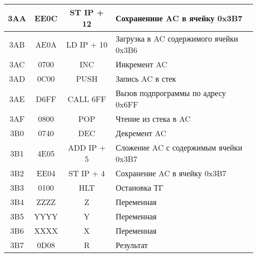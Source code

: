 \begin{flushleft}
\begin{tabular}{|c|c|c|l|}
			3AA & EE0C & ST IP + 12 & Сохраненине AC в ячейку 0x3B7 \\
			\hline
			3AB & AE0A & LD IP + 10 & Загрузка в AC содержимого ячейки 0x3B6 \\

			3AC & 0700 & INC & Инкремент AC \\

			3AD & 0C00 & PUSH & Запись AC в стек \\

			3AE & D6FF & CALL 6FF & Вызов подпрограммы по адресу 0x6FF\\
			3AF & 0800 & POP & Чтение из стека в AC \\

			3B0 & 0740 & DEC & Декремент AC \\

			3B1 & 4E05 & ADD IP + 5 & Сложение AC с содержимым ячейки 0x3B7 \\

			3B2 & EE04 & ST IP + 4 & Сохранение AC в ячейку 0x3B7 \\

			3B3 & 0100 & HLT & Остановка ТГ \\
			\hline
			3B4 & ZZZZ & Z & Переменная \\

			3B5 & YYYY & Y & Переменная \\

			3B6 & XXXX & X & Переменная \\

			3B7 & 0D08 & R & Результат \\
			\hline
	\end{tabular}
\end{flushleft}

\newpage




